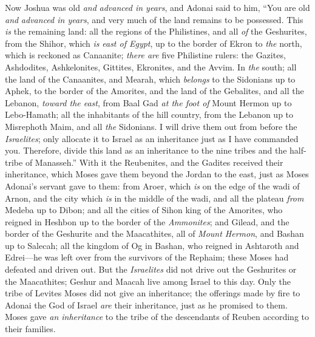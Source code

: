 \begin{biblechapter} %
 Now Joshua was old \textit{and} \textit{advanced in years}, and Adonai said to him, “You are old \textit{and} \textit{advanced in years}, and very much of the land remains to be possessed.
\verse This \textit{is} the remaining land: all the regions of the Philistines, and all \textit{of} the Geshurites,
\verse from the Shihor, which \textit{is} \textit{east of Egypt}, up to the border of Ekron to \textit{the} north, which is reckoned as Canaanite; \textit{there are} five Philistine rulers: the Gazites, Ashdodites, Ashkelonites, Gittites, Ekronites, and the Avvim.
\verse In \textit{the} south; all the land of the Canaanites, and Mearah, which \textit{belongs} to the Sidonians up to Aphek, to the border of the Amorites,
\verse and the land of the Gebalites, and all the Lebanon, \textit{toward the east}, from Baal Gad \textit{at the foot of} Mount Hermon up to Lebo-Hamath;
\verse all the inhabitants of the hill country, from the Lebanon up to Misrephoth Maim, and all \textit{the} Sidonians. I will drive them out from before the \textit{Israelites}; only allocate it to Israel as an inheritance just as I have commanded you.
\verse Therefore, divide this land as an inheritance to the nine tribes and the half-tribe of Manasseh.”
\verse With it the Reubenites, and the Gadites received their inheritance, which Moses gave them beyond the Jordan to the east, just as Moses Adonai’s servant gave to them:
\verse from Aroer, which \textit{is} on the edge of the wadi of Arnon, and the city which \textit{is} in the middle of the wadi, and all the plateau \textit{from} Medeba up to Dibon;
\verse and all the cities of Sihon king of the Amorites, who reigned in Heshbon up to the border of the \textit{Ammonites};
\verse and Gilead, and the border of the Geshurite and the Maacathites, all of \textit{Mount Hermon}, and Bashan up to Salecah;
\verse all the kingdom of Og in Bashan, who reigned in Ashtaroth and Edrei—he was left over from the survivors of the Rephaim; these Moses had defeated and driven out.
\verse But the \textit{Israelites} did not drive out the Geshurites or the Maacathites; Geshur and Maacah live among Israel to this day.
\verse Only the tribe of Levites Moses did not give an inheritance; the offerings made by fire to Adonai the God of Israel \textit{are} their inheritance, just as he promised to them.
 Moses gave \textit{an inheritance} to the tribe of the descendants of Reuben according to their families.

\end{biblechapter}
